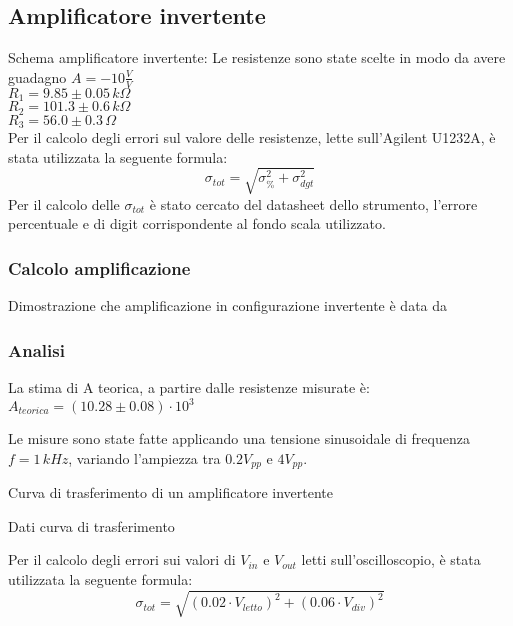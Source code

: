 \subsection{Amplificatore invertente}
Schema amplificatore invertente:
Le resistenze sono state scelte in modo da avere guadagno $A=-10 \frac{V}{V}$\\
$R_1=9.85 \pm 0.05\,k\Omega $\\ %
$R_2=101.3 \pm 0.6\,k\Omega$\\ %
$R_3=56.0 \pm 0.3\,\Omega$\\ %

Per il calcolo degli errori sul valore delle resistenze, lette sull'Agilent U1232A, è stata utilizzata la seguente formula:
$$\sigma_{tot}=\sqrt{ \sigma^{2} _{\%} + \sigma^{2} _{dgt}}$$
Per il calcolo delle $\sigma_{tot}$ è stato cercato del datasheet dello strumento, l'errore percentuale e di digit
corrispondente al fondo scala utilizzato.

\subsubsection{Calcolo amplificazione}
Dimostrazione che amplificazione in configurazione invertente è data da %

\subsubsection{Analisi}
La stima di A teorica, a partire dalle resistenze misurate è:
$A_{teorica}=(10.28 \pm 0.08)\cdot10^3$ %

Le misure sono state fatte applicando una tensione sinusoidale di frequenza $ f=1 \,kHz$, variando l'ampiezza tra 
$0.2 V_{pp}$ e $4 V_{pp}$.

\begin{grafico} 
 \centering 
  
 \caption{Curva di trasferimento di un amplificatore invertente} 
 \label{gr:amp_inv.tex} 
\end{grafico}

\begin{tabella}
 \centering
  
 \caption{Dati curva di trasferimento}
 \label{tab:tab_inv.tex}
\end{tabella}

Per il calcolo degli errori sui valori di $V_{in}$ e $V_{out}$ letti sull'oscilloscopio, è stata utilizzata la seguente formula:
$$\sigma_{tot}=\sqrt{ (0.02\cdot V_{letto})^2 + (0.06 \cdot V_{div})^2}$$

